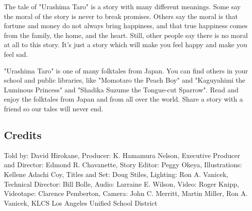 The tale of "Urashima Taro" is a story with many different meanings. Some say the moral of the story is never to break promises. Others say the moral is that fortune and money do not always bring happiness, and that true happiness comes from the family, the home, and the heart. Still, other people say there is no moral at all to this story. It's just a story which will make you feel happy and make you feel sad.

"Urashima Taro" is one of many folktales from Japan. You can find others in your school and public libraries, like "Momotaro the Peach Boy" and "Kaguyahimi the Luminous Princess" and "Shadika Suzume the Tongue-cut Sparrow". Read and enjoy the folktales from Japan and from all over the world. Share a story with a friend so our tales will never end.

\subsection{Credits}

Told by: David Hirokane,
Producer: K. Hamamura Nelson,
Executive Producer and Director: Edmond R. Chavanette,
Story Editor: Peggy Okeya,
Illustrations: Kellene Adachi Coy,
Titles and Set: Doug Stiles,
Lighting: Ron A. Vanicek,
Technical Director: Bill Bolle,
Audio: Larraine E. Wilson,
Video: Roger Knipp,
Videotape: Clarence Pemberton,
Camera: John C. Merritt, Martin Miller, Ron A. Vanicek,
KLCS Los Angeles Unified School District